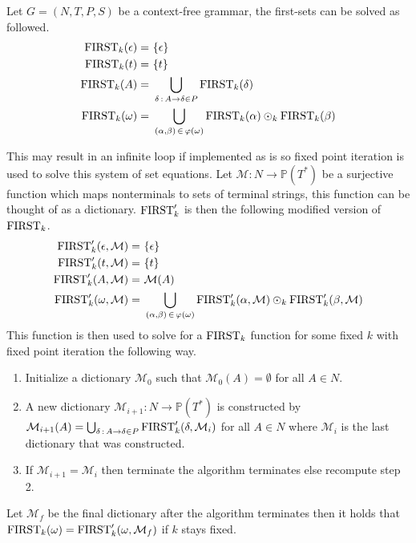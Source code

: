 \begin{algorithm}
    \label{algorithm:first}
    Let $G = (N, T, P, S)$ be a context-free grammar, the first-sets can be solved as followed.
    \begin{align*}
        \text{FIRST}_k(\epsilon) =&\,\, \{\epsilon\} \\
        \text{FIRST}_k(t) =&\,\, \{t\} \\
        \text{FIRST}_k(A) =&\,\, \bigcup_{\delta \, : \, A \to \delta \in P} \text{FIRST}_k(\delta) \\
        \text{FIRST}_k(\omega) =&\,\, \bigcup_{(\alpha, \beta) \, \in \, \varphi(\omega)} \text{FIRST}_k(\alpha) \odot_k \text{FIRST}_k(\beta)
    \end{align*}
\end{algorithm}
\noindent This may result in an infinite loop if implemented as is so fixed point iteration is used to solve this system of set equations. Let $\mathcal{M}: N \to \mathbb{P}(T^*)$ be a surjective function which maps nonterminals to sets of terminal strings, this function can be thought of as a dictionary. $\text{FIRST}'_k$ is then the following modified version of $\text{FIRST}_k$.
\begin{align*}
    \text{FIRST}'_k(\epsilon, \mathcal{M}) =&\,\, \{\epsilon\} \\
    \text{FIRST}'_k(t, \mathcal{M}) =&\,\, \{t\} \\
    \text{FIRST}'_k(A, \mathcal{M}) =&\,\, \mathcal{M}(A) \\
    \text{FIRST}'_k(\omega, \mathcal{M}) =&\,\, \bigcup_{(\alpha, \beta) \, \in \, \varphi(\omega)} \text{FIRST}'_k(\alpha, \mathcal{M}) \odot_k \text{FIRST}'_k(\beta, \mathcal{M})
\end{align*}
This function is then used to solve for a $\text{FIRST}_k$ function for some fixed $k$ with fixed point iteration the following way.
\begin{enumerate}
    \item Initialize a dictionary $\mathcal{M}_0$ such that $\mathcal{M}_0(A) = \emptyset$ for all $A \in N$.
    \item A new dictionary $\mathcal{M}_{i+1}: N \to \mathbb{P}(T^*)$ is constructed by $\mathcal{M}_{i+1}(A) = \bigcup_{\delta \, : \, A \to \delta \in P} \text{FIRST}'_k(\delta, \mathcal{M}_{i})$ for all $A \in N$ where $\mathcal{M}_{i}$ is the last dictionary that was constructed.
    \item If $\mathcal{M}_{i + 1} = \mathcal{M}_{i}$ then terminate the algorithm terminates else recompute step 2.
\end{enumerate}
Let $\mathcal{M}_f$ be the final dictionary after the algorithm terminates then it holds that $\text{FIRST}_k(\omega) = \text{FIRST}'_k(\omega, \mathcal{M}_f)$ if $k$ stays fixed.

